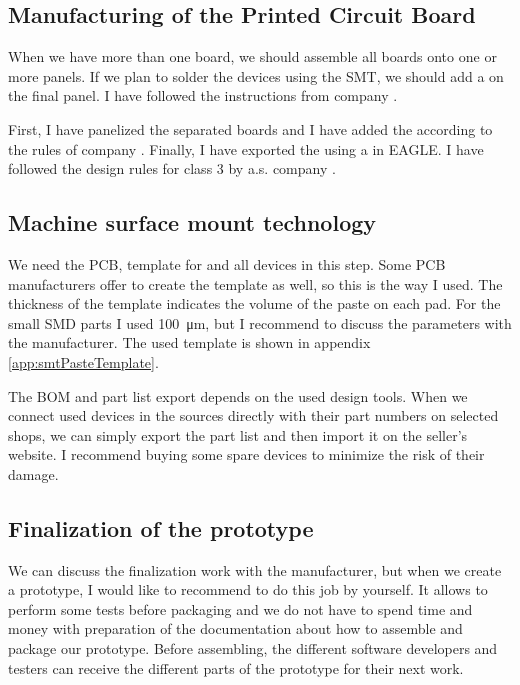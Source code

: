 \subsection{Manufacturing of the Printed Circuit Board}
When we have more than one board, we should assemble all boards onto one or more panels. If we plan to solder the devices using the \ac{SMT}, we should add a  on the final panel. I have followed the instructions from  company \cite{SMTplusManual}.

First, I have panelized the separated boards and I have added the  according to the rules of  company \cite{SMTplusDesignRules}. Finally, I have exported the  using a  \cite{GatemaCAMjob} in \ac{EAGLE}. I have followed the design rules for class 3 by  a.s. company \cite{GatemaDesignRules}.

\subsection{Machine surface mount technology}
We need the \ac{PCB}, template for  and all devices in this step. Some \ac{PCB} manufacturers offer to create the template as well, so this is the way I used. The thickness of the template indicates the volume of the paste on each pad. For the small \ac{SMD} parts I used \SI{100}{\micro\meter}, but I recommend to discuss the parameters with the manufacturer. The used template is shown in appendix \ref{app:smtPasteTemplate}.

The \ac{BOM} and part list export depends on the used design tools. When we connect used devices in the sources directly with their part numbers on selected shops, we can simply export the part list and then import it on the seller's website. I recommend buying some spare devices to minimize the risk of their damage.

\subsection{Finalization of the prototype}
We can discuss the finalization work with the manufacturer, but when we create a prototype, I would like to recommend to do this job by yourself. It allows to perform some tests before packaging and we do not have to spend time and money with preparation of the documentation about how to assemble and package our prototype. Before assembling, the different software developers and testers can receive the different parts of the prototype for their next work.

